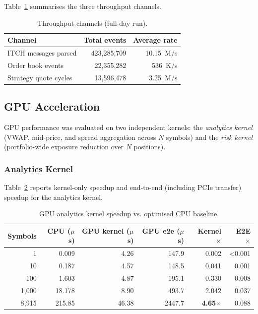 \documentclass[12pt]{article}
\begin{document}
Table~\ref{tab:throughput} summarises the three throughput channels.

\begin{table}[H]
\centering
\small
\caption{Throughput channels (full-day run).}
\label{tab:throughput}
\begin{tabular}{@{}lrr@{}}
\toprule
\textbf{Channel} & \textbf{Total events} & \textbf{Average rate} \\
\midrule
ITCH messages parsed    & 423,285,709 & 10.15~M/s \\
Order book events       &  22,355,282 &   536~K/s \\
Strategy quote cycles   &  13,596,478 &  \phantom{0}3.25~M/s \\
\bottomrule
\end{tabular}
\end{table}

\subsection{GPU Acceleration}
\label{sec:eval:gpu}

GPU performance was evaluated on two independent kernels: the
\textit{analytics kernel} (VWAP, mid-price, and spread aggregation
across $N$ symbols) and the \textit{risk kernel} (portfolio-wide
exposure reduction over $N$ positions).

\subsubsection*{Analytics Kernel}

Table~\ref{tab:gpu_analytics} reports kernel-only speedup and end-to-end
(including PCIe transfer) speedup for the analytics kernel.

\begin{table}[H]
\centering
\small
\caption{GPU analytics kernel speedup vs. optimised CPU baseline.}
\label{tab:gpu_analytics}
\begin{tabular}{@{}rrrrrr@{}}
\toprule
\textbf{Symbols} & \textbf{CPU ($\mu$s)} & \textbf{GPU kernel ($\mu$s)} & \textbf{GPU e2e ($\mu$s)} & \textbf{Kernel $\times$} & \textbf{E2E $\times$} \\
\midrule
      1 &    0.009 &  4.26 & 147.9 & 0.002 & \textless0.001 \\
     10 &    0.187 &  4.57 & 148.5 & 0.041 & 0.001 \\
    100 &    1.603 &  4.87 & 195.1 & 0.330 & 0.008 \\
  1{,}000 &   18.178 &  8.90 & 493.7 & 2.042 & 0.037 \\
  8{,}915 &  215.85  & 46.38 & 2447.7 & \textbf{4.65}$\times$ & 0.088 \\
\bottomrule
\end{tabular}
\end{table}
\end{document}
